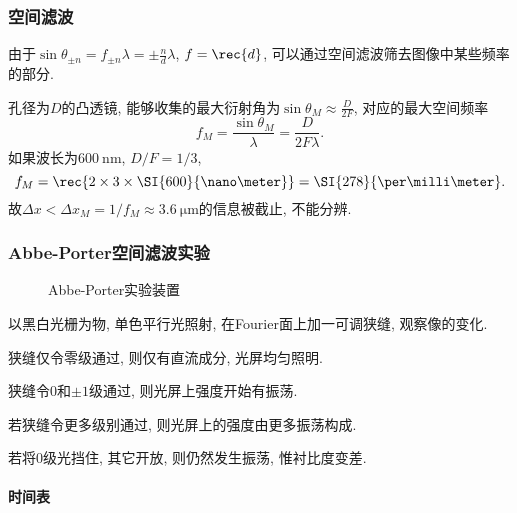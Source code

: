 \documentclass{ctexart}
\begin{document}

\subsubsection{空间滤波} %
\label{ssub:空间滤波}

由于$\sin \theta_{\pm n} = f_{\pm n} \lambda = \displaystyle \pm \frac{n}{d}\lambda$, $\displaystyle f = \rec{d}$, 可以通过空间滤波筛去图像中某些频率的部分.

\begin{sample}
    \begin{ex}
        孔径为$D$的凸透镜, 能够收集的最大衍射角为$\displaystyle \sin\theta_M \approx \frac{D}{2F}$, 对应的最大空间频率
        \[ f_M = \frac{\sin\theta_M}{\lambda} = \frac{D}{2F\lambda}. \]
        如果波长为$\SI{600}{\nano\meter}$, $D/F = 1/3$,
        \[ f_M = \rec{2\times 3 \times \SI{600}{\nano\meter}} = \SI{278}{\per\milli\meter}. \]
        故$\Delta x < \Delta x_M = 1/f_M \approx \SI{3.6}{\micro\meter}$的信息被截止, 不能分辨.
    \end{ex}
\end{sample}


\subsubsection{Abbe-Porter空间滤波实验} %
\label{ssub:abbe_porter空间滤波实验}

\begin{figure}[ht]
    \centering
    \caption{Abbe-Porter实验装置}
\end{figure}
以黑白光栅为物, 单色平行光照射, 在Fourier面上加一可调狭缝, 观察像的变化.
\begin{cenum}
    \item 狭缝仅令零级通过, 则仅有直流成分, 光屏均匀照明.
    \item 狭缝令$0$和$\pm1$级通过, 则光屏上强度开始有振荡.
    \item 若狭缝令更多级别通过, 则光屏上的强度由更多振荡构成.
    \item 若将$0$级光挡住, 其它开放, 则仍然发生振荡, 惟衬比度变差.
\end{cenum}


\paragraph{时间表} %
\label{par:时间表}
\end{document}
